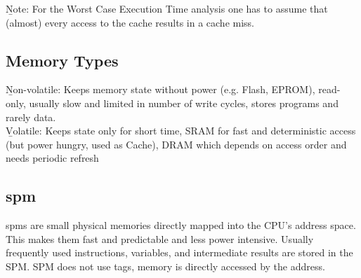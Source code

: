 \b{Note:} For the Worst Case Execution Time analysis one has to assume that (almost) every access to the cache results in a cache miss.

\subsection{Memory Types}
\b{Non-volatile:} Keeps memory state without power (e.g. Flash, EPROM), read-only, usually slow and limited in number of write cycles, stores programs and rarely data.\\[0.5em]
\b{Volatile:} Keeps state only for short time, SRAM for fast and deterministic access (but power hungry, used as Cache), DRAM which depends on access order and needs periodic refresh

\subsection{\ac{spm}}
\acp{spm} are small physical memories directly mapped into the CPU's address space. This makes them fast and predictable and less power intensive. Usually frequently used instructions, variables, and intermediate results are stored in the SPM. SPM does not use tags, memory is directly accessed by the address.

\newpage